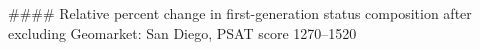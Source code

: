 #### Relative percent change in first-generation status composition after excluding Geomarket: San Diego, PSAT score 1270–1520
